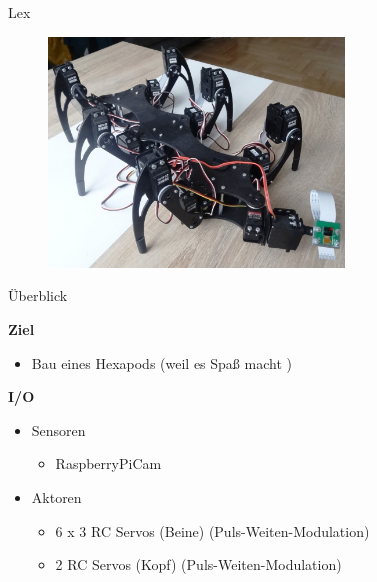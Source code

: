 \documentclass{beamer}
\begin{document}
\begin{frame}{Lex}
 \begin{figure}[H]
  \centering
  \includegraphics[width=0.7\textwidth]{./images/robot-lex.jpg}
 \end{figure}
\end{frame}
\begin{frame}{\"Uberblick}
\begin{large}\textbf{Ziel}\end{large}
\begin{itemize}
	\item Bau eines Hexapods (weil es Spa\ss{} macht \Smiley{})
\end{itemize}
\vspace{20px}
\begin{large}\textbf{I/O}\end{large}
\begin{itemize}
	\item Sensoren
	\begin{itemize}
		\item RaspberryPiCam
	\end{itemize}
	\item Aktoren
	\begin{itemize}
		\item 6 x 3 RC Servos (Beine) (Puls-Weiten-Modulation)
		\item 2 RC Servos (Kopf) (Puls-Weiten-Modulation)
	\end{itemize}
\end{itemize}
\end{frame}
\end{document}
